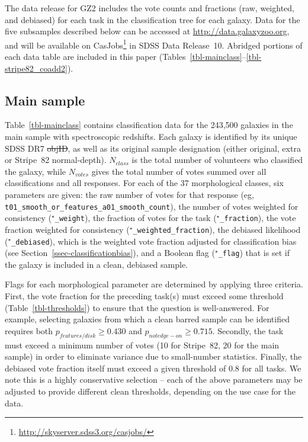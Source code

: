 \documentclass[useAMS,usenatbib]{mn2e}
\providecommand{\DIFaddtex}[1]{{\protect\color{blue}\uwave{#1}}} %
\providecommand{\DIFdeltex}[1]{{\protect\color{red}\sout{#1}}}                      %
\providecommand{\DIFaddbegin}{} %
\providecommand{\DIFaddend}{} %
\providecommand{\DIFdelbegin}{} %
\providecommand{\DIFdelend}{} %
\providecommand{\DIFadd}[1]{\texorpdfstring{\DIFaddtex{#1}}{#1}} %
\providecommand{\DIFdel}[1]{\texorpdfstring{\DIFdeltex{#1}}{}} %
\begin{document}
The data release for GZ2 includes the vote counts and fractions (raw, weighted, and debiased) for each task in the classification tree for each galaxy. Data for the five subsamples described below can be accessed at \url{http://data.galaxyzoo.org}, and will be available on CasJobs\footnote{\url{http://skyserver.sdss3.org/casjobs/}} in SDSS Data Release~10. Abridged portions of each data table are included in this paper (Tables~\ref{tbl-mainclass}--\ref{tbl-stripe82_coadd2}).

\subsection{Main sample}\label{ssec-catalogue_main}

Table~\ref{tbl-mainclass} contains classification data for the 243,500 galaxies in the main sample with spectroscopic redshifts. Each galaxy is identified by its unique SDSS DR7 \DIFdelbegin \DIFdel{objID}\DIFdelend \DIFaddbegin \DIFadd{object ID}\DIFaddend , as well as its original sample designation (either original, extra or Stripe~82 normal-depth). $N_{class}$ is the total number of volunteers who classified the galaxy, while $N_{votes}$ gives the total number of votes summed over all classifications and all responses. For each of the 37 morphological classes, six parameters are given: the raw number of votes for that response (eg, {\tt t01\_smooth\_or\_features\_a01\_smooth\_count}), the number of votes weighted for consistency ({\tt $^\star$\_weight}), the fraction of votes for the task ({\tt $^\star$\_fraction}), the vote fraction weighted for consistency ({\tt $^\star$\_weighted\_fraction}), the debiased likelihood ({\tt $^\star$\_debiased}), which is the weighted vote fraction adjusted for classification bias (see Section~\ref{ssec-classificationbias}), and a Boolean flag ({\tt $^\star$\_flag}) that is set if the galaxy is included in a clean, debiased sample.

Flags for each morphological parameter are determined by applying three criteria. First, the vote fraction for the preceding task(s) must exceed some threshold (Table~\ref{tbl-thresholds}) to ensure that the question is well-answered. For example, selecting galaxies from which a clean barred sample can be identified requires both $p_{features/disk}\geq0.430$ and $p_{not edge-on}\geq0.715$. Secondly, the task must exceed a minimum number of votes (10 for Stripe~82, 20 for the main sample) in order to eliminate variance due to small-number statistics. Finally, the debiased vote fraction itself must exceed a given threshold of 0.8 for all tasks. We note this is a highly conservative selection -- each of the above parameters may be adjusted to provide different clean thresholds, depending on the use case for the data.%
\end{document}
